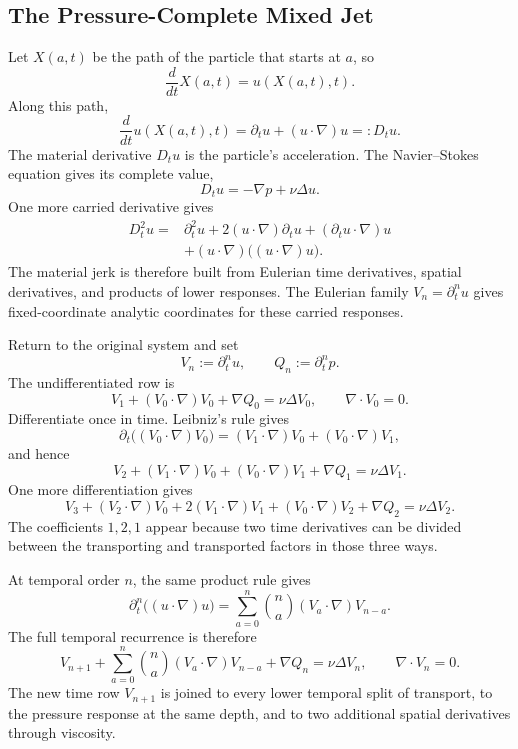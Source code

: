 
\subsection{The Pressure-Complete Mixed Jet}\label{sub:ThePressureCompleteMixedJet}

Let \(X(a,t)\) be the path of the particle that starts at \(a\), so
\[
  \frac{d}{dt}X(a,t)
  =
  u(X(a,t),t).
\]
Along this path,
\[
  \frac{d}{dt}u(X(a,t),t)
  =
  \partial_tu+(u\cdot\nabla)u
  =:
  D_tu.
\]
The material derivative \(D_tu\) is the particle's acceleration.
The Navier--Stokes equation gives its complete value,
\[
  D_tu
  =
  -\nabla p+\nu\Delta u.
\]
One more carried derivative gives
\begin{align*}
  D_t^2u
  ={}&
  \partial_t^2u
  +2(u\cdot\nabla)\partial_tu
  +(\partial_tu\cdot\nabla)u
  \\
  &+
  (u\cdot\nabla)\bigl((u\cdot\nabla)u\bigr).
\end{align*}
The material jerk is therefore built from Eulerian time derivatives, spatial derivatives, and products of lower responses.
The Eulerian family \(V_n=\partial_t^nu\) gives fixed-coordinate analytic coordinates for these carried responses.

Return to the original system and set
\[
  V_n
  :=
  \partial_t^nu,
  \qquad
  Q_n
  :=
  \partial_t^np.
\]
The undifferentiated row is
\[
  V_1
  +(V_0\cdot\nabla)V_0
  +\nabla Q_0
  =
  \nu\Delta V_0,
  \qquad
  \nabla\cdot V_0=0.
\]
Differentiate once in time.
Leibniz's rule gives
\[
  \partial_t\bigl((V_0\cdot\nabla)V_0\bigr)
  =
  (V_1\cdot\nabla)V_0
  +(V_0\cdot\nabla)V_1,
\]
and hence
\[
  V_2
  +(V_1\cdot\nabla)V_0
  +(V_0\cdot\nabla)V_1
  +\nabla Q_1
  =
  \nu\Delta V_1.
\]
One more differentiation gives
\[
  V_3
  +(V_2\cdot\nabla)V_0
  +2(V_1\cdot\nabla)V_1
  +(V_0\cdot\nabla)V_2
  +\nabla Q_2
  =
  \nu\Delta V_2.
\]
The coefficients \(1,2,1\) appear because two time derivatives can be divided between the transporting and transported factors in those three ways.

At temporal order \(n\), the same product rule gives
\[
  \partial_t^n\bigl((u\cdot\nabla)u\bigr)
  =
  \sum_{a=0}^{n}
  \binom{n}{a}
  (V_a\cdot\nabla)V_{n-a}.
\]
The full temporal recurrence is therefore
\[
  V_{n+1}
  +
  \sum_{a=0}^{n}
  \binom{n}{a}
  (V_a\cdot\nabla)V_{n-a}
  +\nabla Q_n
  =
  \nu\Delta V_n,
  \qquad
  \nabla\cdot V_n=0.
\]
The new time row \(V_{n+1}\) is joined to every lower temporal split of transport, to the pressure response at the same depth, and to two additional spatial derivatives through viscosity.


